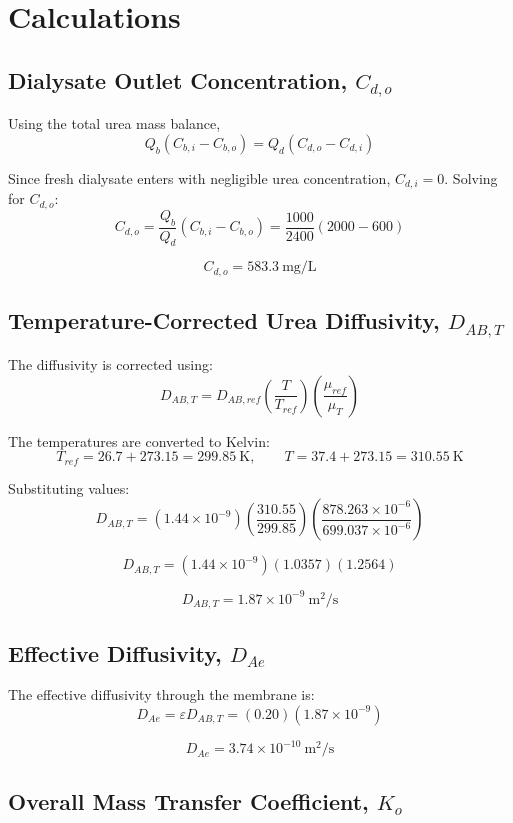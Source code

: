 \documentclass[10.5pt]{article}
\begin{document}
\section{Calculations}

\subsection{Dialysate Outlet Concentration, $C_{d,o}$}

Using the total urea mass balance,
\[
    Q_b(C_{b,i}-C_{b,o}) = Q_d(C_{d,o}-C_{d,i})
\]

Since fresh dialysate enters with negligible urea concentration, $C_{d,i}=0$. Solving for $C_{d,o}$:
\[
    C_{d,o} = \frac{Q_b}{Q_d}(C_{b,i}-C_{b,o})
    = \frac{1000}{2400}(2000-600)
\]

\[
    \boxed{C_{d,o}=583.3 \ \text{mg/L}}
\]

\subsection{Temperature-Corrected Urea Diffusivity, $D_{AB,T}$}

The diffusivity is corrected using:
\[
    D_{AB,T}
    = D_{AB,ref}
    \left(\frac{T}{T_{ref}}\right)
    \left(\frac{\mu_{ref}}{\mu_T}\right)
\]

The temperatures are converted to Kelvin:
\[
    T_{ref}=26.7+273.15=299.85 \ \text{K},
    \qquad
    T=37.4+273.15=310.55 \ \text{K}
\]

Substituting values:
\[
    D_{AB,T}
    = (1.44 \times 10^{-9})
    \left(\frac{310.55}{299.85}\right)
    \left(\frac{878.263 \times 10^{-6}}{699.037 \times 10^{-6}}\right)
\]

\[
    D_{AB,T}
    = (1.44 \times 10^{-9})(1.0357)(1.2564)
\]

\[
    \boxed{D_{AB,T}=1.87 \times 10^{-9} \ \text{m}^2/\text{s}}
\]

\subsection{Effective Diffusivity, $D_{Ae}$}

The effective diffusivity through the membrane is:
\[
    D_{Ae} = \varepsilon D_{AB,T}
    = (0.20)(1.87 \times 10^{-9})
\]

\[
    \boxed{D_{Ae}=3.74 \times 10^{-10} \ \text{m}^2/\text{s}}
\]

\subsection{Overall Mass Transfer Coefficient, $K_o$}
\end{document}
